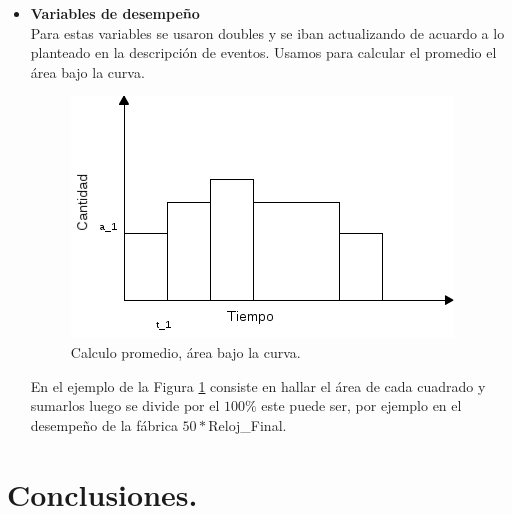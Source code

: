 \documentclass[12pt]{article}
\begin{document}
\begin{itemize}
 	 \item \textbf{Variables de desempeño}\\
 	 Para estas variables se usaron doubles y se iban actualizando de acuardo a lo planteado en la descripción de eventos. Usamos para calcular el promedio el área bajo la curva.
 	 
 	 \begin{figure}
 	  	\centering
 	   		\includegraphics[scale=0.5]{promedio.png} 
     	\caption{Calculo promedio, \'area bajo la curva.}
  		\label{fig:promedios}
 	 \end{figure}
 	 
 	 En el ejemplo de la Figura \ref{fig:promedios} consiste en hallar el área de cada cuadrado y sumarlos luego se divide por el $100\%$ este puede ser, por ejemplo en el desempeño de la f\'abrica  $50*$Reloj\_Final.
 	 
\end{itemize}


\section{Conclusiones.}
\end{document}

